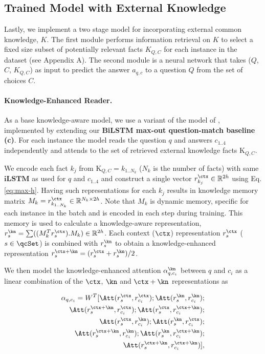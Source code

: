 \subsection{Trained Model with External Knowledge}
\label{subsec:neural-with-knowledge}
Lastly, we implement a two stage model for incorporating external common knowledge, $K$. The first module performs information retrieval on $K$ to select a fixed size subset of potentially relevant facts $K_{Q, C}$ for each instance in the dataset (see Appendix A). The second module is a neural network that takes ($Q$, $C$, $K_{Q, C}$) as input to predict the answer $a_{q, c}$ to a question $Q$ from the set of choices $C$.

\paragraph{Knowledge-Enhanced Reader.} As a base knowledge-aware model, we use a variant of the model of \citet{Mihaylov2018EnhanceCS}, implemented by extending our \textbf{BiLSTM max-out question-match baseline (c)}. For each instance the model reads the question $q$ and answers $c_{1..4}$ independently and attends to the set of retrieved external knowledge facts $\mathrm{K}_{Q, C}$.

We encode each fact $k_j$ from $\mathrm{K}_{Q, C} = k_{1..N_{k}}$ ($N_{k}$ is the number of facts) with same $\mathbf{iLSTM}$ 
as used for $q$ and $c_{1..4}$ and construct a single vector $r^{\ctx}_{k_j} \in \mathbb{R}^{2h}$ using Eq. \ref{eq:max-h}. 
Having such representations for each $k_j$ results in knowledge memory matrix $M_k=r^{\ctx}_{k_{1..N_{k}}} \in \mathbb{R}^{N_{k} \times 2h}$. Note that $M_k$ is dynamic memory, specific for each instance in the batch and is encoded in each step during training. This memory is used to calculate a knowledge-aware representation, $r^{\kn}_{s} = \sum(({M^T_k}r^{\ctx}_{s}).{M_k}) \in \mathbb{R}^{2h}$. 
Each context ($\ctx$) representation $r^{\ctx}_{s}$ ($s \in \qcSet$) is combined with $r^{\kn}_s$ to obtain a knowledge-enhanced representation $r^{\ctx+\kn}_{s}=(r^{\ctx}_{s} + r^{\kn}_{s})/2$. 

We then model the knowledge-enhanced attention $\alpha^{\kn}_{q,c_i}$ between $q$ and $c_i$ as a linear combination of the $\ctx$, $\kn$ and $\ctx+\kn$ representations as

\begin{align*}
\alpha_{q,c_i} = W^T[\Att(r^{\ctx}_{s}, r^{\ctx}_{c_i});\Att(r^{\kn}_{s}, r^{\kn}_{c_i});\\
\Att(r^{\ctx+\kn}_{s}, r^{\ctx}_{c_i});\Att(r^{\ctx}_{s}, r^{\ctx+\kn}_{c_i});\\
\Att(r^{\ctx}_{s}, r^{\kn}_{c_i});\Att(r^{\kn}_{s}, r^{\ctx}_{c_i});\\
\Att(r^{\ctx+\kn}_{s}, r^{\kn}_{c_i});\Att(r^{\kn}_{s}, r^{\ctx+\kn}_{c_i});\\
\Att(r^{\ctx+\kn}_{s}, r^{\ctx+\kn}_{c_i})],
\end{align*}


